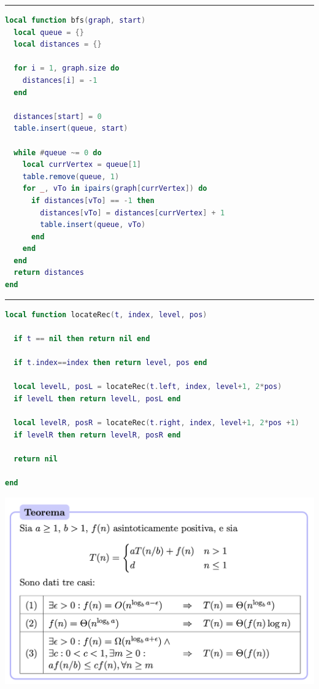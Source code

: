 \vskip3mm
\hrule
\begin{center}
  \begin{lstlisting}[language = lua, frame = none, numbers = none]
  local function bfs(graph, start)
  local queue = {}
  local distances = {}

  for i = 1, graph.size do
    distances[i] = -1
  end

  distances[start] = 0
  table.insert(queue, start)

  while #queue ~= 0 do
    local currVertex = queue[1]
    table.remove(queue, 1)
    for _, vTo in ipairs(graph[currVertex]) do
      if distances[vTo] == -1 then
        distances[vTo] = distances[currVertex] + 1
        table.insert(queue, vTo)
      end
    end
  end
  return distances
end
\end{lstlisting} 
\end{center}
\hrule
\begin{center}
\begin{lstlisting}[language = lua, frame = none, numbers = none]
local function locateRec(t, index, level, pos)

  if t == nil then return nil end

  if t.index==index then return level, pos end

  local levelL, posL = locateRec(t.left, index, level+1, 2*pos)
  if levelL then return levelL, posL end

  local levelR, posR = locateRec(t.right, index, level+1, 2*pos +1)
  if levelR then return levelR, posR end

  return nil

end
  \end{lstlisting} 
\end{center}
\begin{center}
  \includegraphics[width=\textwidth]{Images/MASTER.png }
\end{center}




